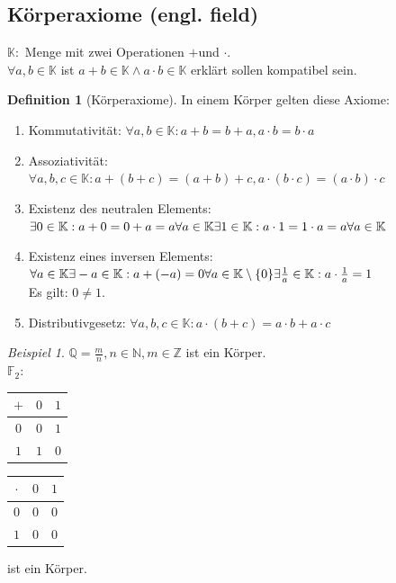 \documentclass[12pt,a4paper,titlepage]{article} %
\theoremstyle{definition}
\newtheorem{defi}{Definition}[subsection]
\theoremstyle{remark}
\newtheorem*{bsp}{Beispiel}
\begin{document}
\subsection{Körperaxiome (engl. field)}
$\mathbb{K:}$ Menge mit zwei Operationen \glqq $+$\grqq und \glqq $\cdot$\grqq.\\
$\forall a,b \in \mathbb{K}$ ist $a+b\in \mathbb{K} \wedge a\cdot b \in \mathbb{K}$ erklärt sollen kompatibel sein.
\begin{defi}[Körperaxiome]
	In einem Körper gelten diese Axiome:
	\begin{enumerate}
		\item Kommutativität: $\forall a,b\in \mathbb{K}: a+b=b+a, a\cdot b=b\cdot a$
		\item Assoziativität: $\forall a,b,c\in \mathbb{K}: a+(b+c) = (a+b)+c, a\cdot (b\cdot c) = (a\cdot b)\cdot c$
		\item Existenz des neutralen Elements: \\
		$\exists 0 \in \mathbb{K}: a + 0 = 0 + a = a \forall a\in \mathbb{K}\\
		\exists 1 \in \mathbb{K}: a \cdot 1 = 1 \cdot a = a \forall a\in\mathbb{K}$
		\item Existenz eines inversen Elements:\\
		$\forall a\in\mathbb{K}\exists -a\in\mathbb{K}:a+ (-a)=0\\
		\forall a\in\mathbb{K}\setminus\{0\}\exists \frac{1}{a}\in\mathbb{K}:a\cdot\frac{1}{a}=1$\\
		Es gilt: $0 \neq 1$.
		\item Distributivgesetz: $\forall a,b,c\in\mathbb{K}:a\cdot(b+c)=a\cdot b + a \cdot c$
	\end{enumerate}
\end{defi}
\begin{bsp}
$\mathbb{Q} = \frac{m}{n}, n \in \mathbb{N}, m\in\mathbb{Z}$ ist ein Körper.\\
$\mathbb{F}_2: $
\begin{tabular}{c|cc}
	$+$ & $0$ & $1$\\
	\hline
	$0$ & $0$ & $1$\\
	$1$ & $1$ & $0$
\end{tabular}
\begin{tabular}{c|cc}
	$\cdot$ & $0$ & $1$\\
	\hline
	$0$ & $0$ & $0$\\
	$1$ & $0$ & $0$
\end{tabular}
ist ein Körper.
\end{bsp}
\end{document}
